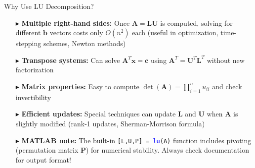 \documentclass[aspectratio=169]{beamer}
\begin{document}
\begin{frame}{Why Use LU Decomposition?}
	\begin{itemize}
		\item[$\blacktriangleright$]
		      \textbf{Multiple right-hand sides:} Once $\mathbf{A} = \mathbf{L}\mathbf{U}$ is computed, solving for different $\mathbf{b}$ vectors costs only $O(n^2)$ each (useful in optimization, time-stepping schemes, Newton methods)
		      \vspace{0.3cm}

		\item[$\blacktriangleright$]
		      \textbf{Transpose systems:} Can solve $\mathbf{A}^T\mathbf{x} = \mathbf{c}$ using $\mathbf{A}^T = \mathbf{U}^T\mathbf{L}^T$ without new factorization
		      \vspace{0.3cm}

		\item[$\blacktriangleright$]
		      \textbf{Matrix properties:} Easy to compute $\det(\mathbf{A}) = \prod_{i=1}^n u_{ii}$ and check invertibility
		      \vspace{0.3cm}

		\item[$\blacktriangleright$]
		      \textbf{Efficient updates:} Special techniques can update $\mathbf{L}$ and $\mathbf{U}$ when $\mathbf{A}$ is slightly modified (rank-1 updates, Sherman-Morrison formula)
		      \vspace{0.3cm}

		\item[$\blacktriangleright$]
		      \textbf{MATLAB note:} The built-in \texttt{[L,U,P] = \textcolor{blue}{lu}(A)} function includes \alert{pivoting} (permutation matrix $\mathbf{P}$) for numerical stability. Always check documentation for output format!
	\end{itemize}
\end{frame}
\end{document}
